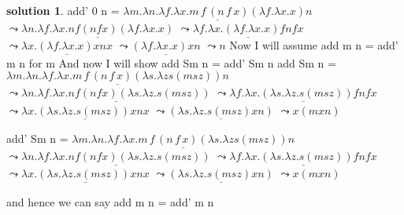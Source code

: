 \documentclass[10pt]{article}
\theoremstyle{definition}
\newtheorem{sol}{solution}
\begin{document}
\begin{sol}
add' 0 n = \newline
$ \underline{ \lambda m.\lambda n.\lambda f.\lambda x. m\,f\,(n\,f\,x) (\lambda f. \lambda x. x) n } $ \newline
$\leadsto \underline{ \lambda n. \lambda f. \lambda x. n f (nfx)(\lambda f. \lambda x.x)}$ \newline
$ \leadsto \underline{\lambda f. \lambda x. ( \lambda f . \lambda x.x) f n f x}$ \newline
$ \leadsto \underline{\lambda x. ( \lambda f. \lambda x.x) x n x} $  \newline
$ \leadsto \underline{(\lambda f. \lambda x. x) x n }$ \newline
$ \leadsto n$ \newline
Now I will assume add m n = add' m n for m \newline
And now I will show add Sm n = add' Sm n \newline
add Sm n = \newline
$ \underline{\lambda m.\lambda n.\lambda f.\lambda x. m\,f\,(n\,f\,x)( \lambda s. \lambda z s (m s z)) n }$ \newline
$ \leadsto \underline{\lambda n. \lambda f. \lambda x. n f(n f x)( \lambda s. \lambda z. s (m s z))}$ \newline
$ \leadsto \underline{ \lambda f. \lambda x. ( \lambda s. \lambda z. s (m s z))f n f x} $ \newline
$ \leadsto \underline{ \lambda x. ( \lambda s. \lambda z. s (m s z))x n x} $ \newline
$ \leadsto \underline{ ( \lambda s. \lambda z. s (m s z)x n)} $ \newline
$ \leadsto x( m x n)$ \newline

add' Sm n = \newline
$ \underline{\lambda m.\lambda n.\lambda f.\lambda x. m\,f\,(n\,f\,x)( \lambda s. \lambda z s (m s z)) n }$ \newline
$ \leadsto \underline{\lambda n. \lambda f. \lambda x. n f(n f x)( \lambda s. \lambda z. s (m s z))}$ \newline
$ \leadsto \underline{ \lambda f. \lambda x. ( \lambda s. \lambda z. s (m s z))f n f x} $ \newline
$ \leadsto \underline{ \lambda x. ( \lambda s. \lambda z. s (m s z))x n x} $ \newline
$ \leadsto \underline{ ( \lambda s. \lambda z. s (m s z)x n)} $ \newline
$ \leadsto x( m x n)$ \newline

and hence we can say add m n = add' m n 




\end{sol}
\end{document}
